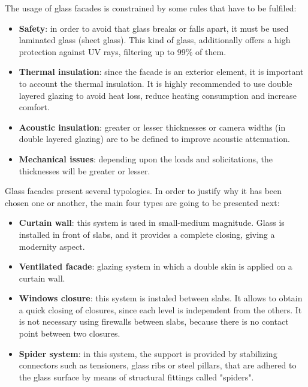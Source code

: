 The usage of glass facades is constrained by some rules that have to be fulfiled:
\begin{itemize}
\item \textbf{Safety}: in order to avoid that glass breaks or falls apart, it must be used laminated glass (sheet glass). This kind of glass, additionally offers a high protection against UV rays, filtering up to 99\% of them.
\item \textbf{Thermal insulation}: since the facade is an exterior element, it is important to account the thermal insulation. It is highly recommended to use double layered glazing to avoid heat loss, reduce heating consumption and increase comfort.
\item \textbf{Acoustic insulation}: greater or lesser thicknesses or camera widths (in double layered glazing) are to be defined to improve acoustic attenuation.
\item \textbf{Mechanical issues}: depending upon the loads and solicitations, the thicknesses will be greater or lesser.
\end{itemize}

Glass facades present several typologies. In order to justify why it has been chosen one or another, the main four types are going to be presented next:
\begin{itemize}
\item \textbf{Curtain wall}: this system is used in small-medium magnitude. Glass is installed in front of slabs, and it provides a complete closing, giving a modernity aspect.
\item \textbf{Ventilated facade}: glazing system in which a double skin is applied on a curtain wall. 
\item \textbf{Windows closure}: this system is instaled between slabs. It allows to obtain a quick closing of closures, since each level is independent from the others. It is not necessary using firewalls between slabs, because there is no contact point between two closures.
\item \textbf{Spider system}: in this system, the support is provided by stabilizing connectors such as tensioners, glass ribs or steel pillars, that are adhered to the glass surface by means of structural fittings called "spiders".
\end{itemize}

